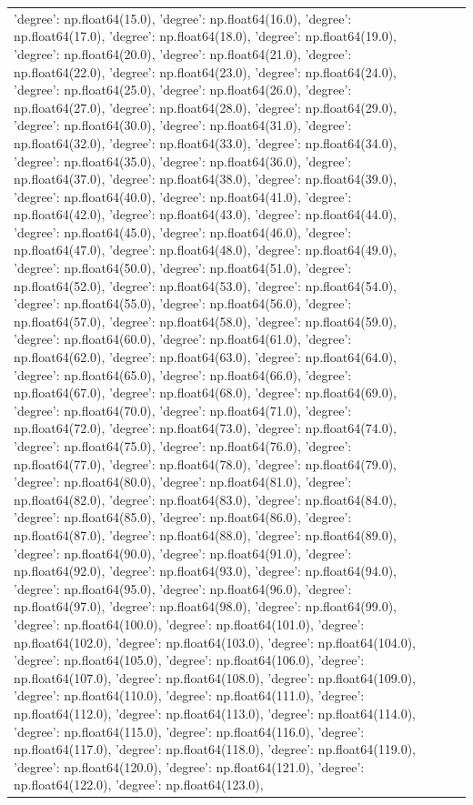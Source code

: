 \documentclass[parskip=half]{scrartcl}
\begin{document}
\begin{tabular}{l|l}
{'degree': np.float64(15.0)}, {'degree': np.float64(16.0)}, {'degree': np.float64(17.0)}, {'degree': np.float64(18.0)}, {'degree': np.float64(19.0)}, {'degree': np.float64(20.0)}, {'degree': np.float64(21.0)}, {'degree': np.float64(22.0)}, {'degree': np.float64(23.0)}, {'degree': np.float64(24.0)}, {'degree': np.float64(25.0)}, {'degree': np.float64(26.0)}, {'degree': np.float64(27.0)}, {'degree': np.float64(28.0)}, {'degree': np.float64(29.0)}, {'degree': np.float64(30.0)}, {'degree': np.float64(31.0)}, {'degree': np.float64(32.0)}, {'degree': np.float64(33.0)}, {'degree': np.float64(34.0)}, {'degree': np.float64(35.0)}, {'degree': np.float64(36.0)}, {'degree': np.float64(37.0)}, {'degree': np.float64(38.0)}, {'degree': np.float64(39.0)}, {'degree': np.float64(40.0)}, {'degree': np.float64(41.0)}, {'degree': np.float64(42.0)}, {'degree': np.float64(43.0)}, {'degree': np.float64(44.0)}, {'degree': np.float64(45.0)}, {'degree': np.float64(46.0)}, {'degree': np.float64(47.0)}, {'degree': np.float64(48.0)}, {'degree': np.float64(49.0)}, {'degree': np.float64(50.0)}, {'degree': np.float64(51.0)}, {'degree': np.float64(52.0)}, {'degree': np.float64(53.0)}, {'degree': np.float64(54.0)}, {'degree': np.float64(55.0)}, {'degree': np.float64(56.0)}, {'degree': np.float64(57.0)}, {'degree': np.float64(58.0)}, {'degree': np.float64(59.0)}, {'degree': np.float64(60.0)}, {'degree': np.float64(61.0)}, {'degree': np.float64(62.0)}, {'degree': np.float64(63.0)}, {'degree': np.float64(64.0)}, {'degree': np.float64(65.0)}, {'degree': np.float64(66.0)}, {'degree': np.float64(67.0)}, {'degree': np.float64(68.0)}, {'degree': np.float64(69.0)}, {'degree': np.float64(70.0)}, {'degree': np.float64(71.0)}, {'degree': np.float64(72.0)}, {'degree': np.float64(73.0)}, {'degree': np.float64(74.0)}, {'degree': np.float64(75.0)}, {'degree': np.float64(76.0)}, {'degree': np.float64(77.0)}, {'degree': np.float64(78.0)}, {'degree': np.float64(79.0)}, {'degree': np.float64(80.0)}, {'degree': np.float64(81.0)}, {'degree': np.float64(82.0)}, {'degree': np.float64(83.0)}, {'degree': np.float64(84.0)}, {'degree': np.float64(85.0)}, {'degree': np.float64(86.0)}, {'degree': np.float64(87.0)}, {'degree': np.float64(88.0)}, {'degree': np.float64(89.0)}, {'degree': np.float64(90.0)}, {'degree': np.float64(91.0)}, {'degree': np.float64(92.0)}, {'degree': np.float64(93.0)}, {'degree': np.float64(94.0)}, {'degree': np.float64(95.0)}, {'degree': np.float64(96.0)}, {'degree': np.float64(97.0)}, {'degree': np.float64(98.0)}, {'degree': np.float64(99.0)}, {'degree': np.float64(100.0)}, {'degree': np.float64(101.0)}, {'degree': np.float64(102.0)}, {'degree': np.float64(103.0)}, {'degree': np.float64(104.0)}, {'degree': np.float64(105.0)}, {'degree': np.float64(106.0)}, {'degree': np.float64(107.0)}, {'degree': np.float64(108.0)}, {'degree': np.float64(109.0)}, {'degree': np.float64(110.0)}, {'degree': np.float64(111.0)}, {'degree': np.float64(112.0)}, {'degree': np.float64(113.0)}, {'degree': np.float64(114.0)}, {'degree': np.float64(115.0)}, {'degree': np.float64(116.0)}, {'degree': np.float64(117.0)}, {'degree': np.float64(118.0)}, {'degree': np.float64(119.0)}, {'degree': np.float64(120.0)}, {'degree': np.float64(121.0)}, {'degree': np.float64(122.0)}, {'degree': np.float64(123.0)}, {'degree': 
\end{tabular}
\end{document}
